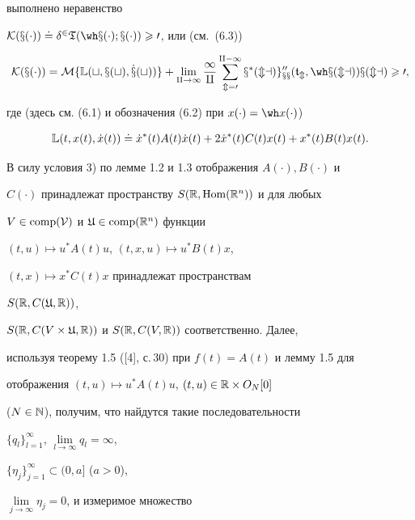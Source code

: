 выполнено неравенство

$\cal K(x(\cdot))\doteq \delta^{2}{\frak T}(\wh

x(\cdot);x(\cdot))\geqslant0$, или (см.~(6.3))

\begin{equation}

\cal K(x(\cdot))=M\{\Bbb L(t,x(t),\Dot x(t))\}+

\lim_{q\to\infty}\frac{1}{q}\sum_{m=0}^{q-1}

x^{*}(ma)g''_{xx}(\frak t_m,\wh x(ma))x(ma)\geqslant0,

\end{equation}

где (здесь см. (6.1) и обозначения (6.2) при $x(\cdot)=\wh x(\cdot)$)

\begin{equation}

\Bbb L(t,x(t),\Dot x(t))\doteq

\Dot{x}^{*}(t)A(t)\Dot x(t)+2\Dot{x}^*(t)C(t)x(t)+

x^*(t)B(t)x(t).

\end{equation} 



В силу условия 3) по лемме 1.2 и 1.3 отображения $A(\cdot), B(\cdot)$ и

$C(\cdot)$ принадлежат пространству $S(\Bbb R,\operatorname{Hom}(\Bbb R^n))$ и для любых

$V\in\operatorname{comp}(\cal V)$ и $\frak U\in\operatorname{comp}(\Bbb R^n)$ функции

$(t,u)\mapsto u^{*}A(t)u$, $(t,x,u)\mapsto u^{*}B(t)x$,

$(t,x)\mapsto x^{*}C(t)x$ принадлежат пространствам

$S(\Bbb R,C(\frak U,\Bbb R))$,

$S(\Bbb R,C(V\times\frak U,\Bbb R))$ и $S(\Bbb

R,C(V,\Bbb R))$ соответственно. Далее,

используя теорему 1.5 ([4], с.\,30) при $f(t)=A(t)$ и лемму 1.5 для

отображения $(t,u)\mapsto u^{*}A(t)u$, $(t,u)\in\Bbb R\times O_N[0]$

($N\in{\Bbb N}$), получим, что найдутся такие последовательности

$\{q_l\}_{l=1}^\infty$, $\lim\limits_{l\to\infty}q_l=\infty$,

$\{\eta_j\}_{j=1}^\infty\subset(0,a]$ ($a>0$),

$\lim\limits_{j\to\infty}\eta_j=0$, и измеримое множество


